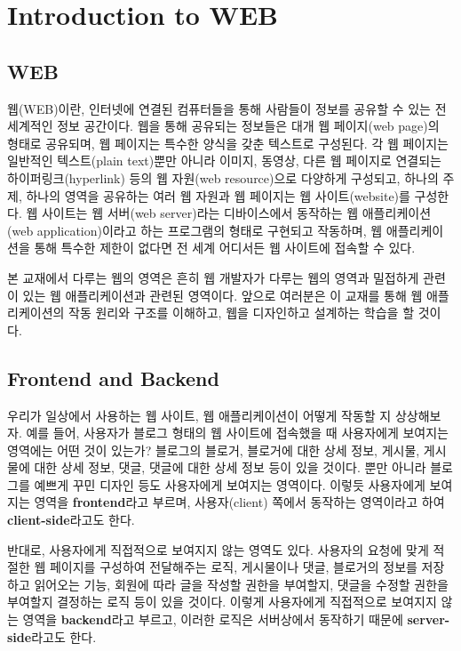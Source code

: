 \section{Introduction to WEB}\label{sect:introduction-to-web}

\subsection*{WEB}

웹(WEB)이란, 인터넷에 연결된 컴퓨터들을 통해 사람들이 정보를 공유할 수 있는 전 세계적인 정보 공간이다. 웹을 통해 공유되는 정보들은 대개 웹 페이지(web page)의 형태로 공유되며, 웹 페이지는 특수한 양식을 갖춘 텍스트로 구성된다. 각 웹 페이지는 일반적인 텍스트(plain text)뿐만 아니라 이미지, 동영상, 다른 웹 페이지로 연결되는 하이퍼링크(hyperlink) 등의 웹 자원(web resource)으로 다양하게 구성되고, 하나의 주제, 하나의 영역을 공유하는 여러 웹 자원과 웹 페이지는 웹 사이트(website)를 구성한다. 웹 사이트는 웹 서버(web server)라는 디바이스에서 동작하는 웹 애플리케이션(web application)이라고 하는 프로그램의 형태로 구현되고 작동하며, 웹 애플리케이션을 통해 특수한 제한이 없다면 전 세계 어디서든 웹 사이트에 접속할 수 있다.

본 교재에서 다루는 웹의 영역은 흔히 웹 개발자가 다루는 웹의 영역과 밀접하게 관련이 있는 웹 애플리케이션과 관련된 영역이다. 앞으로 여러분은 이 교재를 통해 웹 애플리케이션의 작동 원리와 구조를 이해하고, 웹을 디자인하고 설계하는 학습을 할 것이다.

\subsection*{Frontend and Backend}

우리가 일상에서 사용하는 웹 사이트, 웹 애플리케이션이 어떻게 작동할 지 상상해보자. 예를 들어, 사용자가 블로그 형태의 웹 사이트에 접속했을 때 사용자에게 보여지는 영역에는 어떤 것이 있는가? 블로그의 블로거, 블로거에 대한 상세 정보, 게시물, 게시물에 대한 상세 정보, 댓글, 댓글에 대한 상세 정보 등이 있을 것이다. 뿐만 아니라 블로그를 예쁘게 꾸민 디자인 등도 사용자에게 보여지는 영역이다. 이렇듯 사용자에게 보여지는 영역을 \textbf{frontend}라고 부르며, 사용자(client) 쪽에서 동작하는 영역이라고 하여 \textbf{client-side}라고도 한다.

반대로, 사용자에게 직접적으로 보여지지 않는 영역도 있다. 사용자의 요청에 맞게 적절한 웹 페이지를 구성하여 전달해주는 로직, 게시물이나 댓글, 블로거의 정보를 저장하고 읽어오는 기능, 회원에 따라 글을 작성할 권한을 부여할지, 댓글을 수정할 권한을 부여할지 결정하는 로직 등이 있을 것이다. 이렇게 사용자에게 직접적으로 보여지지 않는 영역을 \textbf{backend}라고 부르고, 이러한 로직은 서버상에서 동작하기 때문에 \textbf{server-side}라고도 한다.

